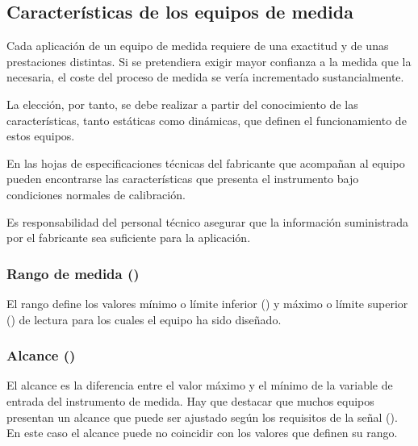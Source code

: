 \subsection{Características de los equipos de medida}
\label{sec:equipos_de_medida:caracteristicas}

Cada aplicación de un equipo de medida requiere de una exactitud y de unas prestaciones distintas. Si se pretendiera exigir mayor confianza a la medida que la necesaria, el coste del proceso de medida se vería incrementado sustancialmente. 

La elección, por tanto, se debe realizar a partir del conocimiento de las características, tanto estáticas como dinámicas, que definen el funcionamiento de estos equipos.

\begin{parrafoDestacado}
En las hojas de especificaciones técnicas del fabricante que acompañan al equipo pueden encontrarse las características que presenta el instrumento bajo condiciones normales de calibración.

Es responsabilidad del personal técnico asegurar que la información suministrada por el fabricante sea suficiente para la aplicación.
\end{parrafoDestacado}

\subsubsection{Rango de medida ()}

El rango define los valores mínimo o límite inferior () y máximo o límite superior () de lectura para los cuales el equipo ha sido diseñado.


\subsubsection{Alcance ()}

El alcance es la diferencia entre el valor máximo y el mínimo de la variable de entrada del instrumento de medida. Hay que destacar que muchos equipos presentan un alcance que puede ser ajustado según los requisitos de la señal (). En este caso el alcance puede no coincidir con los valores que definen su rango.

